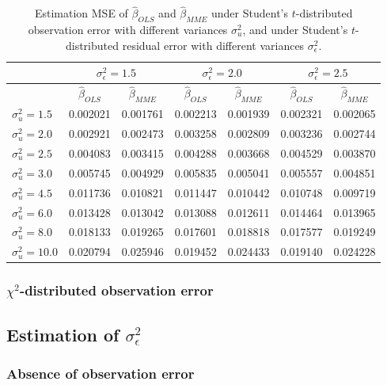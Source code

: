 \documentclass{article}
\begin{document}
\begin{table}[ht]
    \centering
    \caption{Estimation MSE of $\hat{\beta}_{OLS}$ and $\hat{\beta}_{MME}$ under Student's $t$-distributed observation error with different variances $\sigma^2_u$, and under Student's $t$-distributed residual error with different variances $\sigma^2_\epsilon$.}
    \label{Tab:MSE_t}
    \begin{tabular}[t]{lcccccc}
        \hline
        &\multicolumn{2}{c}{$\sigma^2_\epsilon=1.5$}&\multicolumn{2}{c}{$\sigma^2_\epsilon=2.0$}&\multicolumn{2}{c}{$\sigma^2_\epsilon=2.5$}\\
        \hline
        &$\hat{\beta}_{OLS}$&$\hat{\beta}_{MME}$&$\hat{\beta}_{OLS}$&$\hat{\beta}_{MME}$&$\hat{\beta}_{OLS}$&$\hat{\beta}_{MME}$\\
        \hline
        $\sigma^2_u = 1.5$&0.002021&0.001761&0.002213&0.001939&0.002321&0.002065\\
        $\sigma^2_u = 2.0$&0.002921&0.002473&0.003258&0.002809&0.003236&0.002744\\
        $\sigma^2_u = 2.5$&0.004083&0.003415&0.004288&0.003668&0.004529&0.003870\\
        $\sigma^2_u = 3.0$&0.005745&0.004929&0.005835&0.005041&0.005557&0.004851\\
        $\sigma^2_u = 4.5$&0.011736&0.010821&0.011447&0.010442&0.010748&0.009719\\
        $\sigma^2_u = 6.0$&0.013428&0.013042&0.013088&0.012611&0.014464&0.013965\\
        $\sigma^2_u = 8.0$&0.018133&0.019265&0.017601&0.018818&0.017577&0.019249\\
        $\sigma^2_u = 10.0$&0.020794&0.025946&0.019452&0.024433&0.019140&0.024228\\
    \end{tabular}
\end{table}

\subsubsection{$\chi^2$-distributed observation error}

\subsection{Estimation of $\sigma^2_\epsilon$}

\subsubsection{Absence of observation error}
\end{document}

